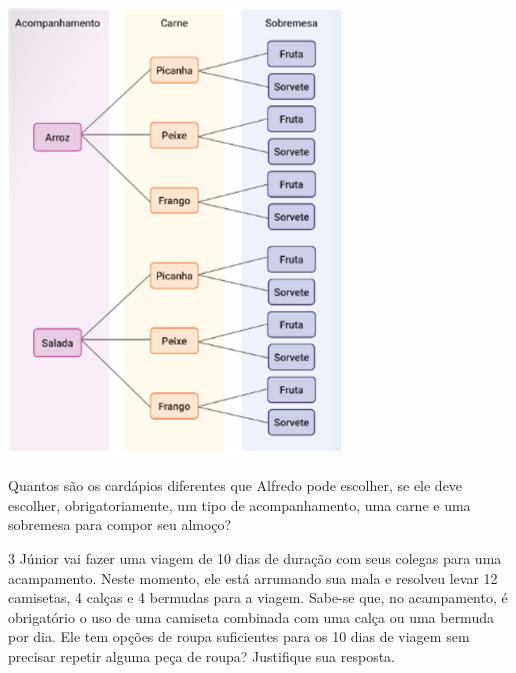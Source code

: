 \begin{mdframed}[linewidth=2pt,linecolor=salmao,roundcorner=2pt]
\begin{escolha}
{\begin{escolha}
\includegraphics[width=3.46697in,height=4.68374in]{media/image138.png}

Quantos são os cardápios diferentes que Alfredo pode escolher, se
ele deve escolher, obrigatoriamente, um tipo de acompanhamento, uma
carne e uma sobremesa para compor seu almoço?

\begin{mdframed}[linewidth=2pt,linecolor=salmao,roundcorner=2pt]
\vspace{2cm}
\end{mdframed}

\num{3} Júnior vai fazer uma viagem de 10 dias de duração com seus colegas para
uma acampamento. Neste momento, ele está arrumando sua mala e resolveu
levar 12 camisetas, 4 calças e 4 bermudas para a viagem. Sabe-se que, no
acampamento, é obrigatório o uso de uma camiseta combinada com uma calça
ou uma bermuda por dia. Ele tem opções de roupa suficientes para os 10 dias de viagem sem
precisar repetir alguma peça de roupa? Justifique sua resposta.

\begin{mdframed}[linewidth=2pt,linecolor=salmao,roundcorner=2pt]
\vspace{2cm}
\end{mdframed}


\end{escolha}}
\end{escolha}
\end{mdframed}

